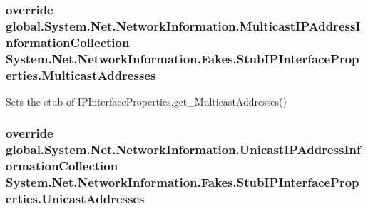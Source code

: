 \hypertarget{class_system_1_1_net_1_1_network_information_1_1_fakes_1_1_stub_i_p_interface_properties_aa35cb9592d0f606b3e5af11447fee7ad}{
\subsubsection[{Multicast\-Addresses}]{\setlength{\rightskip}{0pt plus 5cm}override global.\-System.\-Net.\-Network\-Information.\-Multicast\-I\-P\-Address\-Information\-Collection System.\-Net.\-Network\-Information.\-Fakes.\-Stub\-I\-P\-Interface\-Properties.\-Multicast\-Addresses\hspace{0.3cm}{\ttfamily [get]}}}\label{class_system_1_1_net_1_1_network_information_1_1_fakes_1_1_stub_i_p_interface_properties_aa35cb9592d0f606b3e5af11447fee7ad}


Sets the stub of I\-P\-Interface\-Properties.\-get\-\_\-\-Multicast\-Addresses()

\hypertarget{class_system_1_1_net_1_1_network_information_1_1_fakes_1_1_stub_i_p_interface_properties_a1c6ccf0331a821e408e6ca8cd383f1aa}{
\subsubsection[{Unicast\-Addresses}]{\setlength{\rightskip}{0pt plus 5cm}override global.\-System.\-Net.\-Network\-Information.\-Unicast\-I\-P\-Address\-Information\-Collection System.\-Net.\-Network\-Information.\-Fakes.\-Stub\-I\-P\-Interface\-Properties.\-Unicast\-Addresses\hspace{0.3cm}{\ttfamily [get]}}}\label{class_system_1_1_net_1_1_network_information_1_1_fakes_1_1_stub_i_p_interface_properties_a1c6ccf0331a821e408e6ca8cd383f1aa}


